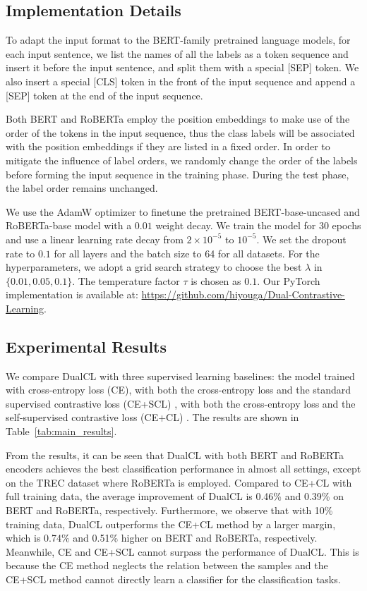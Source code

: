 \subsection{Implementation Details}

To adapt the input format to the BERT-family pretrained language models, for each input sentence, we list the names of all the labels as a token sequence and insert it before the input sentence, and split them with a special [SEP] token. We also insert a special [CLS] token in the front of the input sequence and append a [SEP] token at the end of the input sequence.

Both BERT and RoBERTa employ the position embeddings to make use of the order of the tokens in the input sequence, thus the class labels will be associated with the position embeddings if they are listed in a fixed order. In order to mitigate the influence of label orders, we randomly change the order of the labels before forming the input sequence in the training phase. During the test phase, the label order remains unchanged.

We use the AdamW \cite{loshchilov2018decoupled} optimizer to finetune the pretrained BERT-base-uncased and RoBERTa-base model \cite{wolf2019huggingface} with a $0.01$ weight decay. We train the model for $30$ epochs and use a linear learning rate decay from $2\times10^{-5}$ to $10^{-5}$. We set the dropout rate to $0.1$ for all layers and the batch size to 64 for all datasets. For the hyperparameters, we adopt a grid search strategy to choose the best $\lambda$ in $\{0.01, 0.05, 0.1\}$. The temperature factor $\tau$ is chosen as $0.1$. Our PyTorch implementation is available at: \url{https://github.com/hiyouga/Dual-Contrastive-Learning}.

\subsection{Experimental Results}

We compare DualCL with three supervised learning baselines: the model trained with cross-entropy loss (CE), with both the cross-entropy loss and the standard supervised contrastive loss (CE+SCL) \cite{gunel2021supervised_contrastive_language}, with both the cross-entropy loss and the self-supervised contrastive loss (CE+CL) \cite{gao2021simcse}. The results are shown in Table~\ref{tab:main_results}. 

From the results, it can be seen that DualCL with both BERT and RoBERTa encoders achieves the best classification performance in almost all settings, except on the TREC dataset where RoBERTa is employed. Compared to CE+CL with full training data, the average improvement of DualCL is 0.46\% and 0.39\% on BERT and RoBERTa, respectively. Furthermore, we observe that with 10\% training data, DualCL outperforms the CE+CL method by a larger margin, which is 0.74\% and 0.51\% higher on BERT and RoBERTa, respectively. Meanwhile, CE and CE+SCL cannot surpass the performance of DualCL. This is because the CE method neglects the relation between the samples and the CE+SCL method cannot directly learn a classifier for the classification tasks.

